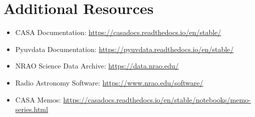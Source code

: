 \documentclass[11pt]{article}
\begin{document}
\section{Additional Resources}

\begin{itemize}
    \item CASA Documentation: \url{https://casadocs.readthedocs.io/en/stable/}
    \item Pyuvdata Documentation: \url{https://pyuvdata.readthedocs.io/en/stable/}
    \item NRAO Science Data Archive: \url{https://data.nrao.edu/}
    \item Radio Astronomy Software: \url{https://www.nrao.edu/software/}
    \item CASA Memos: \url{https://casadocs.readthedocs.io/en/stable/notebooks/memo-series.html}
\end{itemize}
\end{document}
